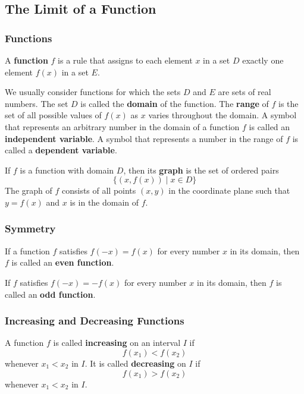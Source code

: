 \subsection{The Limit of a Function}

\subsubsection*{Functions}
\begin{definition}
    A \textbf{function} \(f\) is a rule that assigns to each element \(x\) in
    a set \(D\) exactly one element \(f(x)\) in a set \(E\).
\end{definition}
We usually consider functions for which the sets \(D\) and \(E\) are sets of
real numbers.
The set \(D\) is called the \textbf{domain} of the function.
The \textbf{range} of \(f\) is the set of all possible values of \(f(x)\) as
\(x\) varies throughout the domain.
A symbol that represents an arbitrary number in the domain of a function \(f\)
is called an \textbf{independent variable}.
A symbol that represents a number in the range of \(f\) is called a
\textbf{dependent variable}.

If \(f\) is a function with domain \(D\), then its \textbf{graph} is the set
of ordered pairs
\[\{(x,f(x))\mid x\in D\}\]
The graph of \(f\) consists of all points \((x,y)\) in the coordinate plane
such that \(y=f(x)\) and \(x\) is in the domain of \(f\).

\subsubsection*{Symmetry}
If a function \(f\) satisfies \(f(-x)=f(x)\) for every number \(x\) in its
domain, then \(f\) is called an \textbf{even function}.

If \(f\) satisfies \(f(-x)=-f(x)\) for every number \(x\) in its
domain, then \(f\) is called an \textbf{odd function}.

\subsubsection*{Increasing and Decreasing Functions}
A function \(f\) is called \textbf{increasing} on an interval \(I\) if
\[f(x_1)<f(x_2)\]
whenever \(x_1<x_2\) in \(I\).
It is called \textbf{decreasing} on \(I\) if
\[f(x_1)>f(x_2)\]
whenever \(x_1<x_2\) in \(I\).

